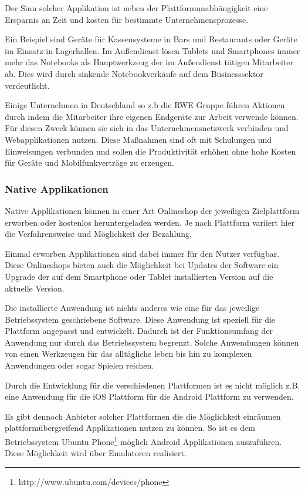 Der Sinn solcher Applikation ist neben der Plattformunabhängigkeit eine Ersparnis an Zeit und kosten für bestimmte Unternehmensprozesse.

Ein Beispiel sind Geräte für Kassensysteme in Bars und Restaurants oder Geräte im Einsatz in Lagerhallen. Im Außendienst lösen Tablets und Smartphones immer mehr das Notebooks als Hauptwerkzeug der im Außendienst tätigen Mitarbeiter ab. Dies wird durch sinkende Notebookverkäufe auf dem Businesssektor verdeutlicht.

Einige Unternehmen in Deutschland so z.b die RWE Gruppe führen Aktionen durch indem die Mitarbeiter ihre eigenen Endgeräte zur Arbeit verwende können. Für diesen Zweck können sie sich in das Unternehmensnetzwerk verbinden und Webapplikationen nutzen. Diese Maßnahmen sind oft mit Schulungen und Einweisungen verbunden und sollen die Produktivität erhöhen ohne hohe Kosten für Geräte und Mobilfunkverträge zu erzeugen.

\subsubsection{Native Applikationen}
\label{natand}

Native Applikationen können in einer Art Onlineshop der jeweiligen Zielplattform erworben oder kostenlos heruntergeladen werden. Je nach Plattform variiert hier die Verfahrensweise und Möglichkeit der Bezahlung.

Einmal erworben Applikationen sind dabei immer für den Nutzer verfügbar. Diese Onlineshops bieten auch die Möglichkeit bei Updates der Software ein Upgrade der auf dem Smartphone oder Tablet installierten Version auf die aktuelle Version.

Die installierte Anwendung ist nichts anderes wie eine für das jeweilige Betriebssystem geschriebene Software. Diese Anwendung ist speziell für die Plattform angepasst und entwickelt. Dadurch ist der Funktionsumfang der Anwendung nur durch das Betriebssystem begrenzt. Solche Anwendungen können von einen Werkzeugen für das alltägliche leben bis hin zu komplexen Anwendungen oder sogar Spielen reichen.

Durch die Entwicklung für die verschiedenen Plattformen ist es nicht möglich z.B. eine Anwendung für die iOS Plattform für die Android Plattform zu verwenden.

Es gibt dennoch Anbieter solcher Plattformen die die Möglichkeit einräumen plattformübergreifend Applikationen nutzen zu können. So ist es dem Betriebssystem Ubuntu Phone\footnote{http://www.ubuntu.com/devices/phone} möglich Android Applikationen auszuführen. Diese Möglichkeit wird über Emulatoren realisiert. 

